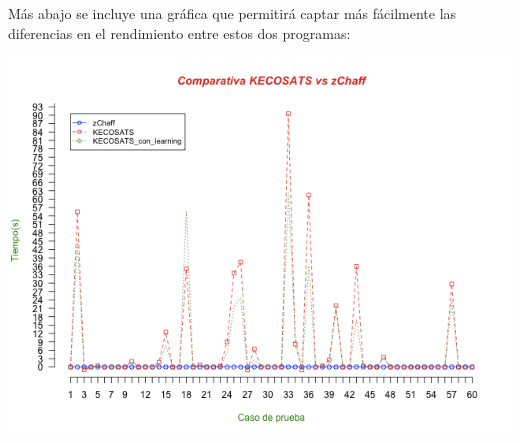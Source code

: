 \documentclass[12pt,lettersize,oneside]{article}
\begin{document}

%


Más abajo se incluye una gráfica que permitirá captar más fácilmente las
diferencias en el rendimiento entre estos dos programas:
\begin{center}
\includegraphics[scale=0.62]{figura1.png}
\end{center}
\end{document}
